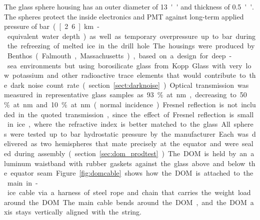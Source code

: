 The glass sphere housing has an outer diameter of \SI{13}{''} and thickness
of \SI{0.5}{''}.
The spheres protect the inside electronics and PMT against long-term applied pressure of 
\unit[250]bar (\unit[2.6]km-equivalent water depth)
as well as temporary overpressure up to \unit[690]bar during the refreezing of melted ice in the drill hole.
The housings were produced by Benthos (Falmouth, Massachusetts), based on a design for deep-sea
environments but using borosilicate glass from Kopp Glass
with very low potassium and other radioactive trace elements that would contribute to the dark noise
count rate (section~\ref{sect:darknoise}).  
Optical transmission was measured in representative glass samples as 93\% at \unit[400]nm,
decreasing to 50\% at \unit[340]nm and 10\% at \unit[315]nm (normal
incidence). Fresnel reflection is not included in the quoted
transmission, since the effect of Fresnel reflection is small in ice,
where the refractive index is better matched to the glass.

All spheres were tested up to \unit[690]bar hydrostatic pressure by the manufacturer.
Each was delivered as two hemispheres that mate precisely at the equator
and were sealed during assembly (section~\ref{sec:dom_prodtest}).  The DOM
is held by an aluminum waistband with rubber gaskets against 
the glass above and below the equator seam. 
Figure~\ref{fig:domcable} shows how the DOM is attached to the main in-ice cable via a harness
of steel rope and chain that carries the weight load around the DOM.
The main cable bends around the DOM, and the DOM axis stays vertically aligned with the string.

